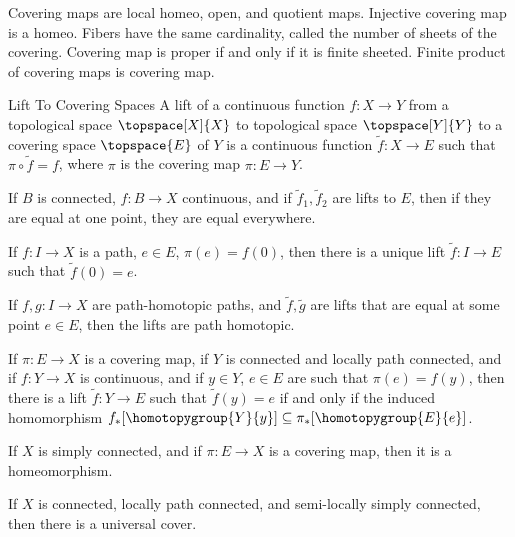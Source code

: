         Covering maps are local homeo, open, and quotient maps. Injective
        covering map is a homeo. Fibers have the same cardinality, called
        the number of sheets of the covering. Covering map is proper if and
        only if it is finite sheeted. Finite product of covering maps is
        covering map.
        \begin{fdefinition}{Lift To Covering Spaces}
            A lift of a continuous function $f:X\rightarrow{Y}$ from a
            topological space $\topspace[X]{X}$ to topological space
            $\topspace[Y]{Y}$ to a covering space $\topspace{E}$ of $Y$ is a
            continuous function $\tilde{f}:X\rightarrow{E}$ such that
            $\pi\circ\tilde{f}=f$, where $\pi$ is the covering map
            $\pi:E\rightarrow{Y}$.
        \end{fdefinition}
        \begin{theorem}
            If $B$ is connected, $f:B\rightarrow{X}$ continuous, and if
            $\tilde{f}_{1},\tilde{f}_{2}$ are lifts to $E$, then if
            they are equal at one point, they are equal everywhere.
        \end{theorem}
        \begin{theorem}
            If $f:I\rightarrow{X}$ is a path, $e\in{E}$, $\pi(e)=f(0)$,
            then there is a unique lift $\tilde{f}:I\rightarrow{E}$ such
            that $\tilde{f}(0)=e$.
        \end{theorem}
        \begin{theorem}
            If $f,g:I\rightarrow{X}$ are path-homotopic paths, and
            $\tilde{f},\tilde{g}$ are lifts that are equal at some point
            $e\in{E}$, then the lifts are path homotopic.
        \end{theorem}
        \begin{theorem}
            If $\pi:E\rightarrow{X}$ is a covering map, if $Y$ is connected
            and locally path connected, and if $f:Y\rightarrow{X}$ is
            continuous, and if $y\in{Y}$, $e\in{E}$ are such that
            $\pi(e)=f(y)$, then there is a lift $\tilde{f}:Y\rightarrow{E}$
            such that $\tilde{f}(y)=e$ if and only if the induced
            homomorphism $f_{*}[\homotopygroup{Y}{y}]\subseteq%
            \pi_{*}[\homotopygroup{E}{e}]$.
        \end{theorem}
        \begin{theorem}
            If $X$ is simply connected, and if $\pi:E\rightarrow{X}$ is a
            covering map, then it is a homeomorphism.
        \end{theorem}
        \begin{theorem}
            If $X$ is connected, locally path connected, and semi-locally
            simply connected, then there is a universal cover.
        \end{theorem}




